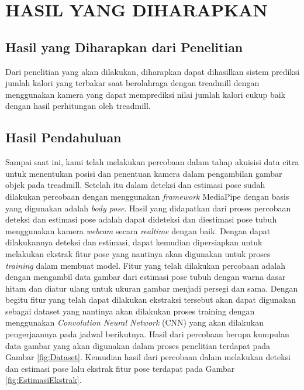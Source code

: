 \chapter{HASIL YANG DIHARAPKAN}

\section{Hasil yang Diharapkan dari Penelitian}

Dari penelitian yang akan dilakukan, diharapkan dapat dihasilkan sistem prediksi jumlah kalori yang terbakar saat berolahraga dengan treadmill dengan menggunakan kamera yang dapat memprediksi nilai jumlah kalori cukup baik dengan hasil perhitungan oleh treadmill.

\section{Hasil Pendahuluan}

Sampai saat ini, kami telah melakukan percobaan dalam tahap akuisisi data citra untuk menentukan posisi dan penentuan kamera dalam pengambilan gambar objek pada treadmill. Setelah itu dalam deteksi dan estimasi pose sudah dilakukan percobaan dengan menggunakan \emph{framework} MediaPipe dengan basis yang digunakan adalah \emph{body pose}. Hasil yang didapatkan dari proses percobaan deteksi dan estimasi pose adalah dapat dideteksi dan diestimasi pose tubuh menggunakan kamera \emph{webcam} secara \emph{realtime} dengan baik. Dengan dapat dilakukannya deteksi dan estimasi, dapat kemudian dipersiapkan untuk melakukan ekstrak fitur pose yang nantinya akan digunakan untuk proses \emph{training} dalam membuat model. Fitur yang telah dilakukan percobaan adalah dengan mengambil data gambar dari estimasi pose tubuh dengan warna dasar hitam dan diatur ulang untuk ukuran gambar menjadi persegi dan sama. Dengan begitu fitur yang telah dapat dilakukan ekstraksi tersebut akan dapat digunakan sebagai dataset yang nantinya akan dilakukan proses training dengan menggunakan \emph{Convolution Neural Network} (CNN) yang akan dilakukan pengerjaannya pada jadwal berikutnya. Hasil dari percobaan berupa kumpulan data gambar yang akan digunakan dalam proses penelitian terdapat pada Gambar \ref{fig:Dataset}. Kemudian hasil dari percobaan dalam melakukan deteksi dan estimasi pose lalu ekstrak fitur pose terdapat pada Gambar \ref{fig:EstimasiEkstrak}.

